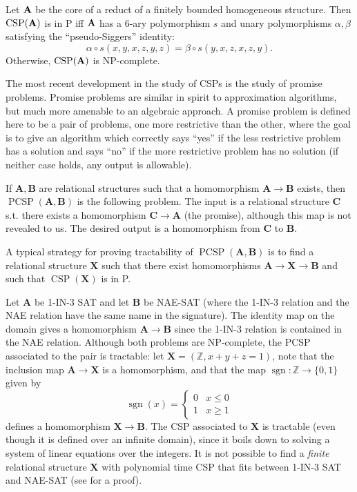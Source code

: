 \documentclass[letterpaper,11pt]{article}
\DeclareMathOperator{\CSP}{CSP}
\begin{document}
\begin{conj} Let $\mathbf{A}$ be the core of a reduct of a finitely bounded homogeneous structure. Then $\CSP(\fA)$ is in P iff $\mathbf{A}$ has a 6-ary polymorphism $s$ and unary polymorphisms $\alpha, \beta$ satisfying the ``pseudo-Siggers'' identity:
\[
\alpha\circ s(x,y,x,z,y,z) = \beta\circ s(y,x,z,x,z,y).
\]
Otherwise, $\CSP(\fA)$ is NP-complete.
\end{conj}

The most recent development in the study of CSPs is the study of promise problems. Promise problems are similar in spirit to approximation algorithms, but much more amenable to an algebraic approach. A promise problem is defined here to be a pair of problems, one more restrictive than the other, where the goal is to give an algorithm which correctly says ``yes'' if the less restrictive problem has a solution and says ``no'' if the more restrictive problem has no solution (if neither case holds, any output is allowable).

\begin{defn} If $\mathbf{A}, \mathbf{B}$ are relational structures such that a homomorphism $\mathbf{A} \rightarrow \mathbf{B}$ exists, then $\operatorname{PCSP}(\mathbf{A},\mathbf{B})$ is the following problem. The input is a relational structure $\mathbf{C}$ s.t. there exists a homomorphism $\mathbf{C} \rightarrow \mathbf{A}$ (the promise), although this map is not revealed to us. The desired output is a homomorphism from $\mathbf{C}$ to $\mathbf{B}$.
\end{defn}

A typical strategy for proving tractability of $\operatorname{PCSP}(\mathbf{A},\mathbf{B})$ is to find a relational structure $\mathbf{X}$ such that there exist homomorphisms $\mathbf{A} \rightarrow \mathbf{X} \rightarrow \mathbf{B}$ and such that $\CSP(\mathbf{X})$ is in P.

\begin{ex} Let $\mathbf{A}$ be 1-IN-3 SAT and let $\mathbf{B}$ be NAE-SAT (where the 1-IN-3 relation and the NAE relation have the same name in the signature). The identity map on the domain gives a homomorphism $\mathbf{A} \rightarrow \mathbf{B}$ since the 1-IN-3 relation is contained in the NAE relation. Although both problems are NP-complete, the PCSP associated to the pair is tractable: let $\mathbf{X} = (\mathbb{Z}, x+y+z=1)$, note that the inclusion map $\mathbf{A} \rightarrow \mathbf{X}$ is a homomorphism, and that the map $\operatorname{sgn}: \mathbb{Z} \rightarrow \{0,1\}$ given by
\[
\operatorname{sgn}(x) = \begin{cases} 0 & x \le 0\\ 1 & x \ge 1\end{cases}
\]
defines a homomorphism $\mathbf{X} \rightarrow \mathbf{B}$. The CSP associated to $\mathbf{X}$ is tractable (even though it is defined over an infinite domain), since it boils down to solving a system of linear equations over the integers. It is not possible to find a \emph{finite} relational structure $\mathbf{X}$ with polynomial time CSP that fits between 1-IN-3 SAT and NAE-SAT (see \cite{pcsp-coloring-full} for a proof).
\end{ex}
\end{document}
